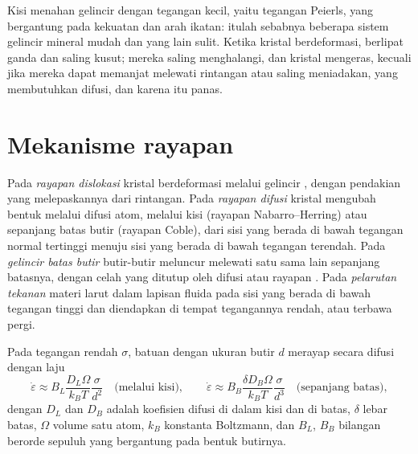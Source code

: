 Kisi menahan gelincir  dengan tegangan kecil, yaitu
tegangan Peierls, yang bergantung pada kekuatan dan arah ikatan:
itulah sebabnya beberapa sistem gelincir mineral mudah dan yang lain sulit. Ketika
kristal berdeformasi,  berlipat ganda dan saling kusut; mereka saling menghalangi, dan
kristal mengeras, kecuali jika mereka dapat memanjat melewati rintangan atau saling meniadakan, yang
membutuhkan difusi, dan karena itu panas.

\section{Mekanisme rayapan}

\begin{definition}\label{def:b3:deformation-mechanisms:creep}
Pada \emph{rayapan dislokasi} kristal berdeformasi melalui
gelincir , dengan pendakian yang melepaskannya dari rintangan. Pada
\emph{rayapan difusi} kristal mengubah bentuk melalui
difusi atom, melalui kisi (rayapan Nabarro--Herring) atau sepanjang
batas butir (rayapan Coble), dari sisi yang berada di bawah tegangan normal tertinggi
menuju sisi yang berada di bawah tegangan terendah. Pada \emph{gelincir batas butir}
butir-butir meluncur melewati satu sama lain sepanjang batasnya, dengan celah yang
ditutup oleh difusi atau rayapan . Pada \emph{pelarutan
tekanan} materi larut dalam lapisan fluida pada sisi yang
berada di bawah tegangan tinggi dan diendapkan di tempat tegangannya rendah, atau terbawa
pergi.
\end{definition}

\begin{proposition}\label{prop:b3:deformation-mechanisms:grain-size}
Pada tegangan rendah $\sigma$, batuan dengan ukuran butir $d$ merayap secara difusi dengan laju
\[
  \dot\varepsilon \approx B_L\frac{D_L\Omega}{k_BT}\frac{\sigma}{d^2}
  \quad\text{(melalui kisi)},\qquad
  \dot\varepsilon \approx B_B\frac{\delta D_B\Omega}{k_BT}\frac{\sigma}{d^3}
  \quad\text{(sepanjang batas)},
\]
dengan $D_L$ dan $D_B$ adalah koefisien difusi di dalam kisi dan di
batas, $\delta$ lebar batas, $\Omega$ volume satu atom,
$k_B$ konstanta Boltzmann, dan $B_L$, $B_B$ bilangan berorde sepuluh yang bergantung pada
bentuk butirnya.
\end{proposition}

